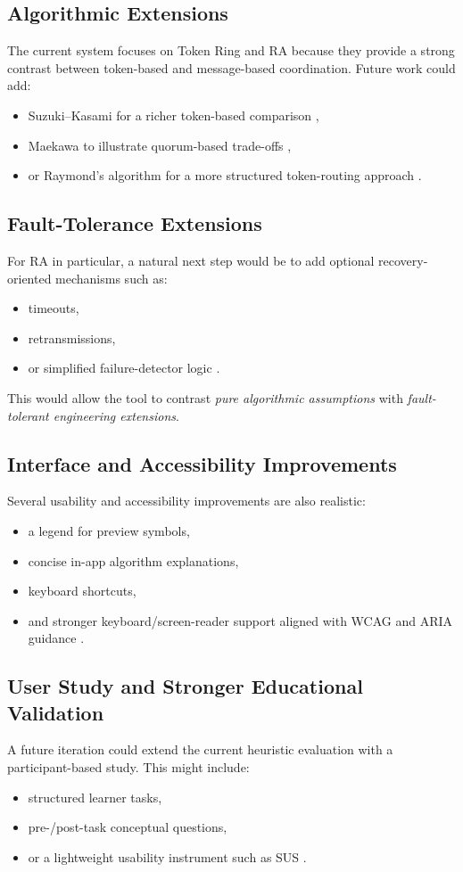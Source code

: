 \subsection{Algorithmic Extensions}
The current system focuses on Token Ring and RA because they provide a strong contrast between token-based and message-based coordination. Future work could add:
\begin{itemize}
  \item Suzuki--Kasami for a richer token-based comparison \cite{suzuki1985distributed},
  \item Maekawa to illustrate quorum-based trade-offs \cite{maekawa1985sqrt},
  \item or Raymond’s algorithm for a more structured token-routing approach \cite{raymond1989tree}.
\end{itemize}

\subsection{Fault-Tolerance Extensions}
For RA in particular, a natural next step would be to add optional recovery-oriented mechanisms such as:
\begin{itemize}
  \item timeouts,
  \item retransmissions,
  \item or simplified failure-detector logic \cite{chandra1996failure}.
\end{itemize}

This would allow the tool to contrast \emph{pure algorithmic assumptions} with \emph{fault-tolerant engineering extensions}.

\subsection{Interface and Accessibility Improvements}
Several usability and accessibility improvements are also realistic:
\begin{itemize}
  \item a legend for preview symbols,
  \item concise in-app algorithm explanations,
  \item keyboard shortcuts,
  \item and stronger keyboard/screen-reader support aligned with WCAG and ARIA guidance \cite{w3c_wcag22,w3c_aria12}.
\end{itemize}

\subsection{User Study and Stronger Educational Validation}
A future iteration could extend the current heuristic evaluation with a participant-based study. This might include:
\begin{itemize}
  \item structured learner tasks,
  \item pre-/post-task conceptual questions,
  \item or a lightweight usability instrument such as SUS \cite{brooke1996sus}.
\end{itemize}

